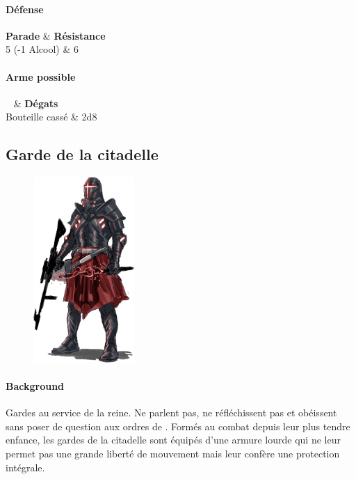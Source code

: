 \paragraph{Défense}
\begin{itemtable}[ c c ]
    \textbf{Parade}     & \textbf{Résistance} \\
    5 (-1 Alcool)       & 6
\end{itemtable}

\paragraph{Arme possible}
\begin{itemtable}[ X c c ]
    ~                & \textbf{Dégats} \\
    Bouteille cassé  & 2d8
\end{itemtable}


\newpage

\subsection{Garde de la citadelle} \label{sec:citadel-guard}
\begin{figure}[h!]
    \centering
    \includegraphics[height=200pt]{_img/bestiary/citadel-guard.png}
\end{figure}
\paragraph{Background}
Gardes au service de la reine. Ne parlent pas, ne réfléchissent pas et obéissent sans poser de question aux ordres de . Formés au combat depuis leur plus tendre enfance, les gardes de la citadelle sont équipés d’une armure lourde qui ne leur permet pas une grande liberté de mouvement mais leur confère une protection intégrale.

